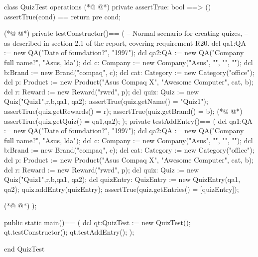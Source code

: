 \begin{vdmpp}[breaklines=true]
class QuizTest
 operations
(*@
\label{assertTrue:3}
@*)
  private assertTrue: bool ==> ()
    assertTrue(cond) == return
    pre cond;
    
(*@
\label{testConstructor:7}
@*)
  private testConstructor()==
  (
    -- Normal scenario for creating quizes,
     -- as described in section 2.1 of the report, covering requirement R20.
   dcl qa1:QA := new QA("Date of foundation?", "1997");
   dcl qa2:QA := new QA("Company full name?", "Asus, lda");
   dcl c: Company := new Company("Asus", "", "", "");
   dcl b:Brand := new Brand("compaq", c);
   dcl cat: Category := new Category("office");
   dcl p: Product := new Product("Asus Compaq X", "Awesome Computer", cat, b);
   dcl r: Reward := new Reward("rwrd", p);
   dcl quiz: Quiz := new Quiz("Quiz1",{r},b,{qa1, qa2});
   assertTrue(quiz.getName() = "Quiz1");
   assertTrue(quiz.getRewards() = {r});
   assertTrue(quiz.getBrand() = b);
(*@
\label{testAddEntry:22}
@*)
   assertTrue(quiz.getQuiz() = {qa1,qa2});
  );
  private testAddEntry()==
   (
   dcl qa1:QA := new QA("Date of foundation?", "1997");
   dcl qa2:QA := new QA("Company full name?", "Asus, lda");
   dcl c: Company := new Company("Asus", "", "", "");
   dcl b:Brand := new Brand("compaq", c);
   dcl cat: Category := new Category("office");
   dcl p: Product := new Product("Asus Compaq X", "Awesome Computer", cat, b);
   dcl r: Reward := new Reward("rwrd", p);
   dcl quiz: Quiz := new Quiz("Quiz1",{r},b,{qa1, qa2});
   dcl quizEntry: QuizEntry := new QuizEntry({qa1, qa2});
   quiz.addEntry(quizEntry);
   assertTrue(quiz.getEntries() = [quizEntry]);
      
(*@
\label{main:38}
@*)
  );
  
  public static main()==
    (
   dcl qt:QuizTest := new QuizTest();
   qt.testConstructor();
   qt.testAddEntry();
    );
     
end QuizTest
\end{vdmpp}
